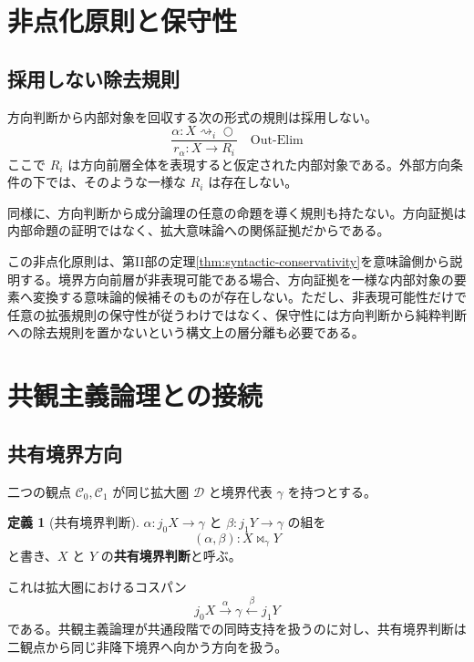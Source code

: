 \documentclass[a4paper,11pt]{ltjsarticle}
\theoremstyle{definition}
\newtheorem{definition}{定義}[section]
\theoremstyle{plain}
\newcommand{\dfix}{\bigcirc}
\begin{document}
\section{非点化原則と保守性}

\subsection{採用しない除去規則}

方向判断から内部対象を回収する次の形式の規則は採用しない。
\begin{equation}
 \frac{\alpha:X\rightsquigarrow_i\dfix}
      {r_\alpha:X\to R_i}
 \quad\mathrm{Out\mbox{-}Elim}
 \label{rule:forbidden-elim}
\end{equation}
ここで $R_i$ は方向前層全体を表現すると仮定された内部対象である。外部方向条件の下では、そのような一様な $R_i$ は存在しない。

同様に、方向判断から成分論理の任意の命題を導く規則も持たない。方向証拠は内部命題の証明ではなく、拡大意味論への関係証拠だからである。

この非点化原則は、第II部の定理\ref{thm:syntactic-conservativity}を意味論側から説明する。境界方向前層が非表現可能である場合、方向証拠を一様な内部対象の要素へ変換する意味論的候補そのものが存在しない。ただし、非表現可能性だけで任意の拡張規則の保守性が従うわけではなく、保守性には方向判断から純粋判断への除去規則を置かないという構文上の層分離も必要である。

\section{共観主義論理との接続}

\subsection{共有境界方向}

二つの観点 $\mathcal C_0,\mathcal C_1$ が同じ拡大圏 $\mathcal D$ と境界代表 $\gamma$ を持つとする。

\begin{definition}[共有境界判断]
$\alpha:j_0X\to\gamma$ と $\beta:j_1Y\to\gamma$ の組を
\begin{equation}
 (\alpha,\beta):X\bowtie_\gamma Y
 \label{eq:shared-boundary}
\end{equation}
と書き、$X$ と $Y$ の\textbf{共有境界判断}と呼ぶ。
\end{definition}

これは拡大圏におけるコスパン
\[
 j_0X\xrightarrow{\alpha}\gamma
 \xleftarrow{\beta}j_1Y
\]
である。共観主義論理が共通段階での同時支持を扱うのに対し、共有境界判断は二観点から同じ非降下境界へ向かう方向を扱う。
\end{document}
